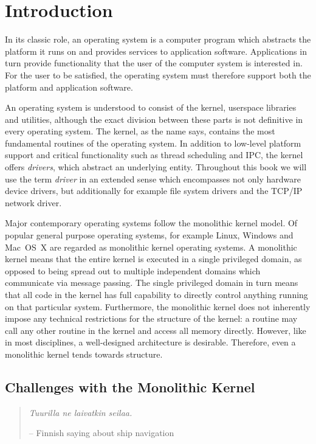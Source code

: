 
\section{Introduction}
\label{chap:introduction}

In its classic role, an operating system is a computer program
which abstracts the platform it runs on and provides services to
application software.  Applications in turn provide functionality that
the user of the computer system is interested in.  For the user to be
satisfied, the operating system must therefore support both the platform
and application software.

An operating system is understood to consist of the kernel, userspace
libraries and utilities, although the exact division between these
parts is not definitive in every operating system.  The kernel, as the
name says, contains the most fundamental routines of the operating
system.  In addition to low-level platform support and critical
functionality such as thread scheduling and IPC, the kernel offers
\textit{drivers}, which abstract an underlying entity.  Throughout this
book we will use the term \textit{driver} in an extended sense
which encompasses not only hardware device drivers, but additionally
for example file system drivers and the TCP/IP network driver.

Major contemporary operating systems follow the monolithic kernel model.
Of popular general purpose operating systems, for example Linux, Windows
and Mac~OS~X are regarded as monolithic kernel operating systems.
A monolithic kernel means that the entire kernel is executed in a single
privileged domain, as opposed to being spread out to multiple independent
domains which communicate via message passing.  The single privileged
domain in turn means that all code in the kernel has full capability to
directly control anything running on that particular system.  Furthermore,
the monolithic kernel does not inherently impose any technical
restrictions for the structure of the kernel: a routine may call any other
routine in the kernel and access all memory directly.  However, like
in most disciplines, a well-designed architecture is desirable.
Therefore, even a monolithic kernel tends towards structure.

\subsection{Challenges with the Monolithic Kernel}
\label{sect:challenge}

\begin{quote}
\emph{Tuurilla ne laivatkin seilaa.}

-- Finnish saying about ship navigation
\end{quote}

